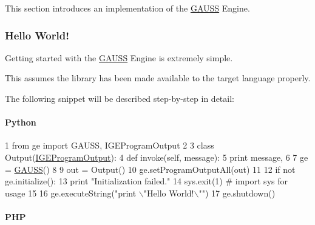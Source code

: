 This section introduces an implementation of the \hyperlink{class_g_a_u_s_s}{G\-A\-U\-S\-S} Engine.

\subsubsection*{Hello World!}

Getting started with the \hyperlink{class_g_a_u_s_s}{G\-A\-U\-S\-S} Engine is extremely simple.

This assumes the library has been made available to the target language properly.

The following snippet will be described step-\/by-\/step in detail\-:

\paragraph*{Python}


\begin{DoxyCode}
1 \textcolor{keyword}{from} ge \textcolor{keyword}{import} GAUSS, IGEProgramOutput
2 
3 \textcolor{keyword}{class }Output(\hyperlink{class_i_g_e_program_output}{IGEProgramOutput}):
4     \textcolor{keyword}{def }invoke(self, message):
5         \textcolor{keywordflow}{print} message,
6 
7 ge = \hyperlink{class_g_a_u_s_s}{GAUSS}()
8 
9 out = Output()
10 ge.setProgramOutputAll(out)
11 
12 \textcolor{keywordflow}{if} \textcolor{keywordflow}{not} ge.initialize():
13     \textcolor{keywordflow}{print} \textcolor{stringliteral}{"Initialization failed."}
14     sys.exit(1)     \textcolor{comment}{# import sys for usage}
15 
16 ge.executeString(\textcolor{stringliteral}{"print \(\backslash\)"Hello World!\(\backslash\)""})
17 ge.shutdown()
\end{DoxyCode}


\paragraph*{P\-H\-P}




